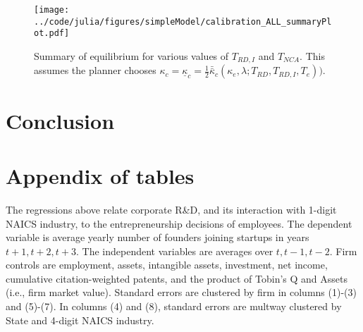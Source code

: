 \documentclass[11pt,english]{article}
\begin{document}
\begin{figure}[]
	\texttt{[image: ../code/julia/figures/simpleModel/calibration\_ALL\_summaryPlot.pdf]}
	\caption{Summary of equilibrium for various values of $T_{RD,I}$ and $T_{NCA}$. This assumes the planner chooses $\kappa_c = \underline{\kappa}_c = \frac{1}{2} \bar{\bar{\kappa}}_c(\kappa_e,\lambda;T_{RD},T_{RD,I},T_e))$.}
	\label{calibration_ALL_summaryPlot}
\end{figure}

\section{Conclusion}





\appendix


\section{Appendix of tables}

\setcounter{table}{0}
\renewcommand{\thetable}{\Alph{section}\arabic{table}}









\begin{table}[!htb]
	\scriptsize
	\centering
	
	\caption{The regressions above relate corporate R\&D, and its interaction with 1-digit NAICS industry, to the  entrepreneurship decisions of employees. The dependent variable is average yearly number of founders joining startups in years $t+1,t+2,t+3$. The independent variables are averages over $t,t-1,t-2$. Firm controls are employment, assets, intangible assets, investment, net income, cumulative citation-weighted patents, and the product of Tobin's Q and Assets (i.e., firm market value). Standard errors are clustered by firm in columns (1)-(3) and (5)-(7). In columns (4) and (8), standard errors are multway clustered by State and 4-digit NAICS industry.}
	\label{table:RDandSpinoutFormation_absolute_founder2_hNCA_l3f3}
\end{table}
\end{document}
